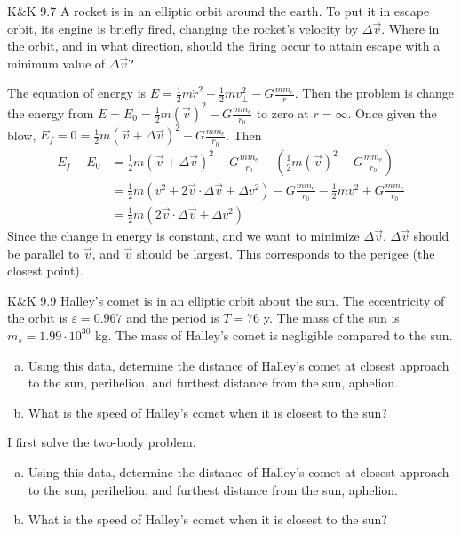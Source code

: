 \documentclass{esg8012pset}
\begin{document}
\begin{problem}{K\&K 9.7}
  A rocket is in an elliptic orbit around the earth. To put it in escape orbit, its engine is briefly fired, changing the rocket's velocity by $\Delta \vec v$. Where in the orbit, and in what direction, should the firing occur to attain escape with a minimum value of $\Delta \vec v$?
\end{problem}
\begin{solution}
The equation of energy is $E = \frac{1}{2} m\dot r^2 + \frac{1}{2}m v_{\bot}^2 - G\frac{m m_e}{r}$.  Then the problem is change the energy from $E = E_0 = \frac{1}{2} m(\vec v)^2 - G\frac{m m_e}{r_0}$ to zero at $r =\infty$.  Once given the blow, $E_f = 0 = \frac{1}{2} m(\vec v + \Delta \vec v)^2 - G\frac{m m_e}{r_0}$.  Then
\begin{align*}
E_f - E_0 & = \frac{1}{2} m(\vec v + \Delta \vec v)^2 - G\frac{m m_e}{r_0} -   \left(\frac{1}{2} m(\vec v)^2 - G\frac{m m_e}{r_0}\right) \\
 & = \frac{1}{2} m(v^2 + 2\vec v\cdot \Delta \vec v + \Delta v^2) - G\frac{m m_e}{r_0} - \frac{1}{2} mv^2 + G\frac{m m_e}{r_0} \\
 & = \frac{1}{2} m(2\vec v\cdot \Delta \vec v + \Delta v^2)
\end{align*}
Since the change in energy is constant, and we want to minimize $\Delta \vec v$, $\Delta \vec v$ should be parallel to $\vec v$, and $\vec v$ should be largest.  This corresponds to the perigee (the closest point).

\begin{problem}{K\&K 9.9}
  Halley's comet is in an elliptic orbit about the sun. The eccentricity of the orbit is $\varepsilon = 0.967$ and the period is $T = 76$ y. The mass of the sun is $m_s = 1.99 \cdot 10^{30}$ kg.  The mass of Halley's comet is negligible compared to the sun.
  \begin{enumerate}[(a)]
    \item Using this data, determine the distance of Halley's comet at closest approach to the sun, perihelion, and furthest distance from the sun, aphelion.
    \item What is the speed of Halley's comet when it is closest to the sun?
  \end{enumerate}
\end{problem}
\begin{solution}
I first solve the two-body problem.

% 
% 
% 


\begin{enumerate}[(a)]
  \item Using this data, determine the distance of Halley's comet at closest approach to the sun, perihelion, and furthest distance from the sun, aphelion.
  \item What is the speed of Halley's comet when it is closest to the sun?
\end{enumerate}
\end{solution}



\end{solution}
\end{document}
